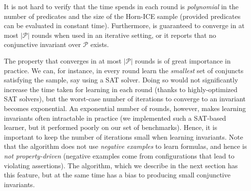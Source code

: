 
It is not hard to verify that the time \houdini spends in each round is \emph{polynomial} in the number of predicates and the size of the Horn-ICE sample (provided predicates can be evaluated in constant time).
Furthermore, \houdini is guaranteed to converge in at most $|\mathcal P|$ rounds when used in an iterative setting, or it reports that no conjunctive invariant over $\mathcal P$ exists.

The property that \houdini converges in at most $|\mathcal P|$ rounds is of great importance in practice.
We can, for instance, in every round learn the \emph{smallest} set of conjuncts satisfying the sample, say using a SAT solver.
Doing so would not significantly increase the time taken for learning in each round (thanks to highly-optimized SAT solvers), but the worst-case number of iterations to converge to an invariant becomes exponential.
An exponential number of rounds, however, makes learning invariants often intractable in practice (we implemented such a SAT-based learner, but it performed poorly on our set of benchmarks).
Hence, it is important to keep the number of iterations small when learning invariants.
Note that the \houdini algorithm does not use \emph{negative examples} to learn formulas, and hence is \emph{not property-driven} (negative examples come from configurations that lead to violating assertions).
The \sorcar algorithm, which we describe in the next section 
has this feature, but at the same time has a bias to producing small conjunctive invariants.
